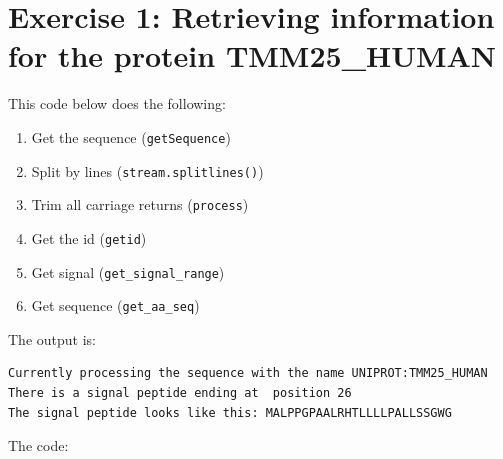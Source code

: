 \documentclass{article} %
\begin{document}
\section{Exercise 1: Retrieving information for the protein TMM25\_HUMAN}

This code below does the following:

\begin{enumerate}
  \item Get the sequence (\verb+getSequence+)
  \item Split by lines (\verb+stream.splitlines()+)
  \item Trim all carriage returns (\verb+process+)
  \item Get the id (\verb+getid+)
  \item Get signal (\verb+get_signal_range+)
  \item Get sequence (\verb+get_aa_seq+)
\end{enumerate}

The output is: 

\begin{verbatim}
Currently processing the sequence with the name UNIPROT:TMM25_HUMAN
There is a signal peptide ending at  position 26
The signal peptide looks like this: MALPPGPAALRHTLLLLPALLSSGWG
\end{verbatim}

The code:
\end{document}
